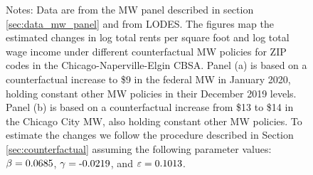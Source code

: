 \begin{figure}[h!]
    \begin{minipage}{.95\textwidth} \footnotesize
        \vspace{2.5mm}
        Notes: 
        Data are from the MW panel described in section \ref{sec:data_mw_panel} 
        and from LODES.
        The figures map the estimated changes in log total rents per square foot
        and log total wage income under different counterfactual MW policies for 
        ZIP codes in the Chicago-Naperville-Elgin CBSA.
        Panel (a) is based on a counterfactual increase to \$9 in the 
        federal MW in January 2020, holding constant other MW policies in their 
        December 2019 levels.
        Panel (b) is based on a counterfactual increase from \$13 to \$14 in the 
        Chicago City MW, also holding constant other MW policies.
        To estimate the changes we follow the procedure described in Section 
        \ref{sec:counterfactual} assuming the following parameter values: 
        $\beta = \textnormal{0.0685}$, $\gamma = \textnormal{-0.0219}$, and $\varepsilon = \textnormal{0.1013}$.
    \end{minipage}
\end{figure}
